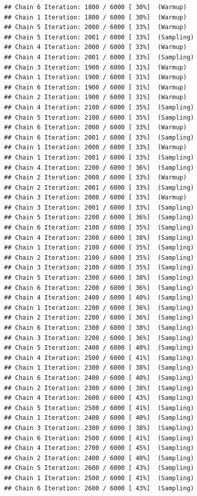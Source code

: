 \documentclass[
]{article}
\begin{document}
\begin{verbatim}
## Chain 6 Iteration: 1800 / 6000 [ 30%]  (Warmup) 
## Chain 1 Iteration: 1800 / 6000 [ 30%]  (Warmup) 
## Chain 5 Iteration: 2000 / 6000 [ 33%]  (Warmup) 
## Chain 5 Iteration: 2001 / 6000 [ 33%]  (Sampling) 
## Chain 4 Iteration: 2000 / 6000 [ 33%]  (Warmup) 
## Chain 4 Iteration: 2001 / 6000 [ 33%]  (Sampling) 
## Chain 3 Iteration: 1900 / 6000 [ 31%]  (Warmup) 
## Chain 1 Iteration: 1900 / 6000 [ 31%]  (Warmup) 
## Chain 6 Iteration: 1900 / 6000 [ 31%]  (Warmup) 
## Chain 2 Iteration: 1900 / 6000 [ 31%]  (Warmup) 
## Chain 4 Iteration: 2100 / 6000 [ 35%]  (Sampling) 
## Chain 5 Iteration: 2100 / 6000 [ 35%]  (Sampling) 
## Chain 6 Iteration: 2000 / 6000 [ 33%]  (Warmup) 
## Chain 6 Iteration: 2001 / 6000 [ 33%]  (Sampling) 
## Chain 1 Iteration: 2000 / 6000 [ 33%]  (Warmup) 
## Chain 1 Iteration: 2001 / 6000 [ 33%]  (Sampling) 
## Chain 4 Iteration: 2200 / 6000 [ 36%]  (Sampling) 
## Chain 2 Iteration: 2000 / 6000 [ 33%]  (Warmup) 
## Chain 2 Iteration: 2001 / 6000 [ 33%]  (Sampling) 
## Chain 3 Iteration: 2000 / 6000 [ 33%]  (Warmup) 
## Chain 3 Iteration: 2001 / 6000 [ 33%]  (Sampling) 
## Chain 5 Iteration: 2200 / 6000 [ 36%]  (Sampling) 
## Chain 6 Iteration: 2100 / 6000 [ 35%]  (Sampling) 
## Chain 4 Iteration: 2300 / 6000 [ 38%]  (Sampling) 
## Chain 1 Iteration: 2100 / 6000 [ 35%]  (Sampling) 
## Chain 2 Iteration: 2100 / 6000 [ 35%]  (Sampling) 
## Chain 3 Iteration: 2100 / 6000 [ 35%]  (Sampling) 
## Chain 5 Iteration: 2300 / 6000 [ 38%]  (Sampling) 
## Chain 6 Iteration: 2200 / 6000 [ 36%]  (Sampling) 
## Chain 4 Iteration: 2400 / 6000 [ 40%]  (Sampling) 
## Chain 1 Iteration: 2200 / 6000 [ 36%]  (Sampling) 
## Chain 2 Iteration: 2200 / 6000 [ 36%]  (Sampling) 
## Chain 6 Iteration: 2300 / 6000 [ 38%]  (Sampling) 
## Chain 3 Iteration: 2200 / 6000 [ 36%]  (Sampling) 
## Chain 5 Iteration: 2400 / 6000 [ 40%]  (Sampling) 
## Chain 4 Iteration: 2500 / 6000 [ 41%]  (Sampling) 
## Chain 1 Iteration: 2300 / 6000 [ 38%]  (Sampling) 
## Chain 6 Iteration: 2400 / 6000 [ 40%]  (Sampling) 
## Chain 2 Iteration: 2300 / 6000 [ 38%]  (Sampling) 
## Chain 4 Iteration: 2600 / 6000 [ 43%]  (Sampling) 
## Chain 5 Iteration: 2500 / 6000 [ 41%]  (Sampling) 
## Chain 1 Iteration: 2400 / 6000 [ 40%]  (Sampling) 
## Chain 3 Iteration: 2300 / 6000 [ 38%]  (Sampling) 
## Chain 6 Iteration: 2500 / 6000 [ 41%]  (Sampling) 
## Chain 4 Iteration: 2700 / 6000 [ 45%]  (Sampling) 
## Chain 2 Iteration: 2400 / 6000 [ 40%]  (Sampling) 
## Chain 5 Iteration: 2600 / 6000 [ 43%]  (Sampling) 
## Chain 1 Iteration: 2500 / 6000 [ 41%]  (Sampling) 
## Chain 6 Iteration: 2600 / 6000 [ 43%]  (Sampling) 

\end{verbatim}
\end{document}
